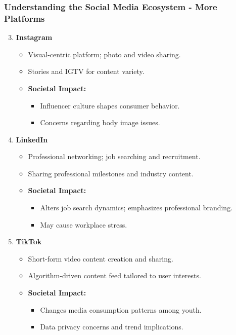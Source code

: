 \documentclass{beamer}
\begin{document}
\begin{frame}[fragile]
    \frametitle{Understanding the Social Media Ecosystem - More Platforms}
    
    \begin{enumerate}
        \setcounter{enumi}{2}
        \item \textbf{Instagram}
        \begin{itemize}
            \item Visual-centric platform; photo and video sharing.
            \item Stories and IGTV for content variety.
            \item \textbf{Societal Impact:}
            \begin{itemize}
                \item Influencer culture shapes consumer behavior.
                \item Concerns regarding body image issues.
            \end{itemize}
        \end{itemize}
        
        \item \textbf{LinkedIn}
        \begin{itemize}
            \item Professional networking; job searching and recruitment.
            \item Sharing professional milestones and industry content.
            \item \textbf{Societal Impact:}
            \begin{itemize}
                \item Alters job search dynamics; emphasizes professional branding.
                \item May cause workplace stress.
            \end{itemize}
        \end{itemize}
        
        \item \textbf{TikTok}
        \begin{itemize}
            \item Short-form video content creation and sharing.
            \item Algorithm-driven content feed tailored to user interests.
            \item \textbf{Societal Impact:}
            \begin{itemize}
                \item Changes media consumption patterns among youth.
                \item Data privacy concerns and trend implications.
            \end{itemize}
        \end{itemize}
    \end{enumerate}
\end{frame}
\end{document}

